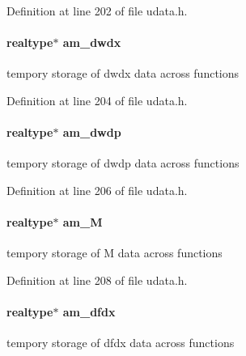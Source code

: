 Definition at line 202 of file udata.\+h.

\hypertarget{struct_user_data_a0dee61b81181232717bffd84f3535b53}{}
\paragraph[{am\+\_\+dwdx}]{\setlength{\rightskip}{0pt plus 5cm}realtype$\ast$ am\+\_\+dwdx}\label{struct_user_data_a0dee61b81181232717bffd84f3535b53}
tempory storage of dwdx data across functions 

Definition at line 204 of file udata.\+h.

\hypertarget{struct_user_data_a7a0e690a17e9784061b5d50b6eafa442}{}
\paragraph[{am\+\_\+dwdp}]{\setlength{\rightskip}{0pt plus 5cm}realtype$\ast$ am\+\_\+dwdp}\label{struct_user_data_a7a0e690a17e9784061b5d50b6eafa442}
tempory storage of dwdp data across functions 

Definition at line 206 of file udata.\+h.

\hypertarget{struct_user_data_aed8938f3dd5b3c2a72c41d09907ec435}{}
\paragraph[{am\+\_\+\+M}]{\setlength{\rightskip}{0pt plus 5cm}realtype$\ast$ am\+\_\+\+M}\label{struct_user_data_aed8938f3dd5b3c2a72c41d09907ec435}
tempory storage of M data across functions 

Definition at line 208 of file udata.\+h.

\hypertarget{struct_user_data_add62c739ea5cc6d2a6be03eb2bbdfe95}{}
\paragraph[{am\+\_\+dfdx}]{\setlength{\rightskip}{0pt plus 5cm}realtype$\ast$ am\+\_\+dfdx}\label{struct_user_data_add62c739ea5cc6d2a6be03eb2bbdfe95}
tempory storage of dfdx data across functions 

